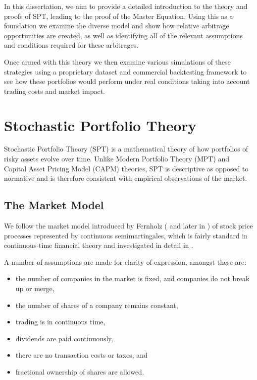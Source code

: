 \documentclass[british]{amsart} \usepackage{lmodern}
\numberwithin{equation}{section} \numberwithin{figure}{section}
\theoremstyle{plain} \newtheorem{thm}{\protect\theoremname}[section]
\theoremstyle{definition} \newtheorem{defn}[thm]{\protect\definitionname}
\theoremstyle{plain} \newtheorem{assumption}[thm]{\protect\assumptionname}
\theoremstyle{plain} \newtheorem{lem}[thm]{\protect\lemmaname}
\theoremstyle{plain} \newtheorem{prop}[thm]{\protect\propositionname}
\theoremstyle{remark} \newtheorem{rem}[thm]{\protect\remarkname}
\theoremstyle{plain} \newtheorem{cor}[thm]{\protect\corollaryname}
\begin{document}
\begin{enumerate}
\end{enumerate}

In this dissertation, we aim to provide a detailed introduction to the theory
and proofs of SPT, leading to the proof of the Master Equation. Using this as a
foundation we examine the diverse model and show how relative arbitrage
opportunities are created, as well as identifying all of the relevant
assumptions and conditions required for these arbitrages.

Once armed with this theory we then examine various simulations of these
strategies using a proprietary dataset and commercial backtesting framework to
see how these portfolios would perform under real conditions taking into account
trading costs and market impact.


\section{Stochastic Portfolio Theory}

Stochastic Portfolio Theory (SPT) is a mathematical theory of how portfolios of
risky assets evolve over time. Unlike Modern Portfolio Theory (MPT) and Capital Asset
Pricing Model (CAPM) theories, SPT is descriptive as opposed to normative and is
therefore consistent with empirical observations of the market.

\subsection{The Market Model}

We follow the market model introduced by Fernholz (\cite{fernholz1999pgf} and
later in \cite{fernholz2009}) of stock price processes represented by continuous
semimartingales, which is fairly standard in continuous-time financial theory
and investigated in detail in \cite{karatzas1998}.

A number of assumptions are made for clarity of expression, amongst these are:

\begin{itemize}
  \item the number of companies in the market is fixed, and companies do not 
        break up or merge,
  \item the number of shares of a company remains constant,
  \item trading is in continuous time,
  \item dividends are paid continuously,
  \item there are no transaction costs or taxes, and
  \item fractional ownership of shares are allowed.
\end{itemize}
\end{document}

